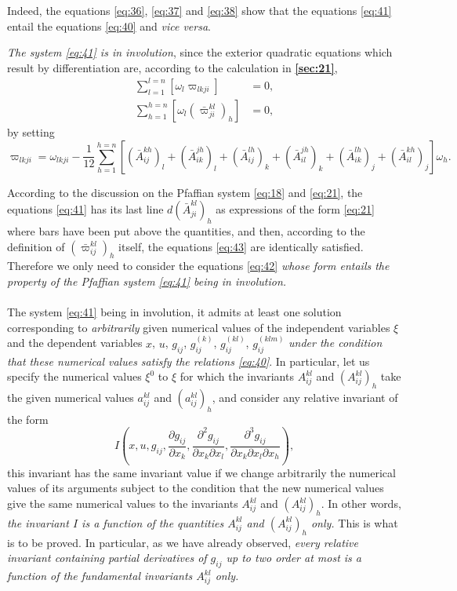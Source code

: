 \documentclass[leqno,12pt]{article}
\newcommand{\pd}{\partial}
\theoremstyle{shape1}
\theoremstyle{shape0}
\theoremstyle{shape2}
\theoremstyle{definition}
\begin{document}
Indeed, the equations \eqref{eq:36}, \eqref{eq:37} and \eqref{eq:38} show that the equations \eqref{eq:41} entail the equations \eqref{eq:40} and \emph{vice versa}.

\emph{The system \eqref{eq:41} is in involution}, since the exterior quadratic equations which result by differentiation are, according to the calculation in \textsection\textbf{\ref{sec:21}},
\begin{align}
  \label{eq:42}
  \sum_{l=1}^{l=n}[\omega_{l}\varpi_{lkji}]&=0,\\
  \label{eq:43}
  \sum_{h=1}^{h=n}[\omega_{l}(\bar\varpi^{kl}_{ji})_{h}]&=0,
\end{align}
by setting
\[
\varpi_{lkji}=\omega_{lkji}-\frac{1}{12}\sum_{h=1}^{h=n}[(\bar A^{kh}_{ij})_{l}+(\bar A^{jh}_{ik})_{l}+(\bar A^{lh}_{ij})_{k}+(\bar A^{jh}_{il})_{k}+(\bar A^{lh}_{ik})_{j}+(\bar A^{kh}_{il})_{j}]\omega_{h}.
\]

According to the discussion on the Pfaffian system \eqref{eq:18} and \eqref{eq:21}, the equations \eqref{eq:41} has its last line $d(\bar A^{kl}_{ji})_{h}$ as expressions of the form \eqref{eq:21} where bars have been put above the quantities, and then, according to the definition of $(\bar\varpi^{kl}_{ij})_{h}$ itself, the equations \eqref{eq:43} are identically satisfied. Therefore we only need to consider the equations \eqref{eq:42} \emph{whose form entails the property of the Pfaffian system \eqref{eq:41} being in involution.}



\paragraph{}
\label{sec:23}
The system \eqref{eq:41} being in involution, it admits at least one solution corresponding to \emph{arbitrarily} given numerical values of the independent variables $\xi$ and the dependent variables $x$, $u$, $g_{ij}$, $g_{ij}^{(k)}$, $g_{ij}^{(kl)}$, $g_{ij}^{(klm)}$ \emph{under the condition that these numerical values satisfy the relations \eqref{eq:40}}. In particular, let us specify the numerical values $\xi^{0}$ to $\xi$ for which the invariants $A^{kl}_{ij}$ and $(A^{kl}_{ij})_{h}$ take the given numerical values $a_{ij}^{kl}$ and $(a_{ij}^{kl})_{h}$, and consider any relative invariant of the form
\[
I\left(x,u,g_{ij},\frac{\pd g_{ij}}{\pd x_{k}},\frac{\pd^{2}g_{ij}}{\pd x_{k}\pd x_{l}},\frac{\pd ^{3}g_{ij}}{\pd x_{k}\pd x_{l}\pd x_{h}}\right),
\]
this invariant has the same invariant value if we change arbitrarily the numerical values of its arguments subject to the condition that the new numerical values give the same numerical values to the invariants $A^{kl}_{ij}$ and $(A^{kl}_{ij})_{h}$. In other words, \emph{the invariant $I$ is a function of the quantities $A^{kl}_{ij}$ and $(A^{kl}_{ij})_{h}$ only.} This is what is to be proved. In particular, as we have already observed, \emph{every relative invariant containing partial derivatives of $g_{ij}$ up to two order at most is a function of the fundamental invariants $A^{kl}_{ij}$ only.}
\end{document}
